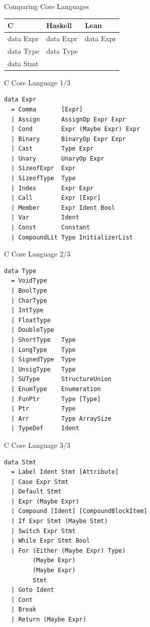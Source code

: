 \documentclass[pdf]{beamer}
\begin{document}
\begin{frame}{Comparing Core Languages}
  \begin{table}[]
    \noindent
    \begin{tabular}{|l|l|l|}
      \hline
      \textbf{C}  & \textbf{Haskell}  & \textbf{Lean} \\
      \hline
      data Expr   & data Expr         & data Expr     \\
      data Type   & data Type         &               \\
      data Stmt   &                   &               \\
      \hline
    \end{tabular}
  \end{table}
\end{frame}

\begin{frame}[fragile]{C Core Language 1/3}
  \begin{verbatim}
data Expr
  = Comma       [Expr]
  | Assign      AssignOp Expr Expr
  | Cond        Expr (Maybe Expr) Expr
  | Binary      BinaryOp Expr Expr
  | Cast        Type Expr
  | Unary       UnaryOp Expr
  | SizeofExpr  Expr
  | SizeofType  Type
  | Index       Expr Expr
  | Call        Expr [Expr]
  | Member      Expr Ident Bool
  | Var         Ident
  | Const       Constant
  | CompoundLit Type InitializerList
  \end{verbatim}
\end{frame}

\begin{frame}[fragile]{C Core Language 2/3}
  \begin{verbatim}
data Type
  = VoidType
  | BoolType
  | CharType
  | IntType
  | FloatType
  | DoubleType
  | ShortType   Type
  | LongType    Type
  | SignedType  Type
  | UnsigType   Type
  | SUType      StructureUnion
  | EnumType    Enumeration
  | FunPtr      Type [Type]
  | Ptr         Type
  | Arr         Type ArraySize
  | TypeDef     Ident
  \end{verbatim}
\end{frame}

\begin{frame}[fragile]{C Core Language 3/3}
  \begin{verbatim}
data Stmt
  = Label Ident Stmt [Attribute]
  | Case Expr Stmt
  | Default Stmt
  | Expr (Maybe Expr)
  | Compound [Ident] [CompoundBlockItem]
  | If Expr Stmt (Maybe Stmt)
  | Switch Expr Stmt
  | While Expr Stmt Bool
  | For (Either (Maybe Expr) Type)
        (Maybe Expr)
        (Maybe Expr)
        Stmt
  | Goto Ident
  | Cont
  | Break
  | Return (Maybe Expr)
  \end{verbatim}
\end{frame}
\end{document}
